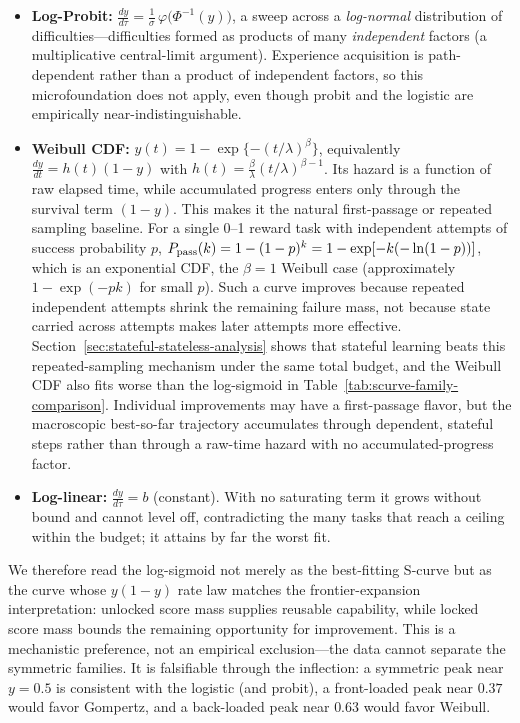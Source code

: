 \begin{itemize}
  \item \textbf{Log-Probit:} $\frac{dy}{d\tau}=\frac{1}{\sigma}\,
  \varphi\!\big(\Phi^{-1}(y)\big)$, a sweep across a \emph{log-normal}
  distribution of difficulties---difficulties formed as products of many
  \emph{independent} factors (a multiplicative central-limit argument).
  Experience acquisition is path-dependent rather than a product of independent
  factors, so this microfoundation does not apply, even though probit and the
  logistic are empirically near-indistinguishable.

  \item \textbf{Weibull CDF:} $y(t)=1-\exp\{-(t/\lambda)^\beta\}$, equivalently
  $\frac{dy}{dt}=h(t)(1-y)$ with
  $h(t)=\frac{\beta}{\lambda}(t/\lambda)^{\beta-1}$. Its hazard is a function
  of raw elapsed time, while accumulated progress enters only through the
  survival term $(1-y)$. This makes it the natural first-passage or repeated
  sampling baseline. For a single 0--1 reward task with independent attempts of
  success probability $p$,
  $P_{\rm pass}(k)=1-(1-p)^k=1-\exp[-k(-\ln(1-p))]$, which is an exponential
  CDF, the $\beta=1$ Weibull case (approximately $1-\exp(-pk)$ for small
  $p$). Such a curve improves because repeated independent attempts shrink the
  remaining failure mass, not because state carried across attempts makes later
  attempts more effective. Section~\ref{sec:stateful-stateless-analysis} shows
  that stateful learning beats this repeated-sampling mechanism under the same
  total budget, and the Weibull CDF also fits worse than the log-sigmoid in
  Table~\ref{tab:scurve-family-comparison}. Individual improvements may have a
  first-passage flavor, but the macroscopic best-so-far trajectory accumulates
  through dependent, stateful steps rather than through a raw-time hazard with no
  accumulated-progress factor.

  \item \textbf{Log-linear:} $\frac{dy}{d\tau}=b$ (constant). With no
  saturating term it grows without bound and cannot level off, contradicting the
  many tasks that reach a ceiling within the budget; it attains by far the worst
  fit.
\end{itemize}
We therefore read the log-sigmoid not merely as the best-fitting S-curve but as
the curve whose \(y(1-y)\) rate law matches the frontier-expansion interpretation:
unlocked score mass supplies reusable capability, while locked score mass bounds
the remaining opportunity for improvement.
This is a mechanistic preference, not an empirical exclusion---the data cannot
separate the symmetric families. It is falsifiable through the inflection: a
symmetric peak near $y=0.5$ is consistent with the logistic (and probit), a
front-loaded peak near $0.37$ would favor Gompertz, and a back-loaded peak near
$0.63$ would favor Weibull.
